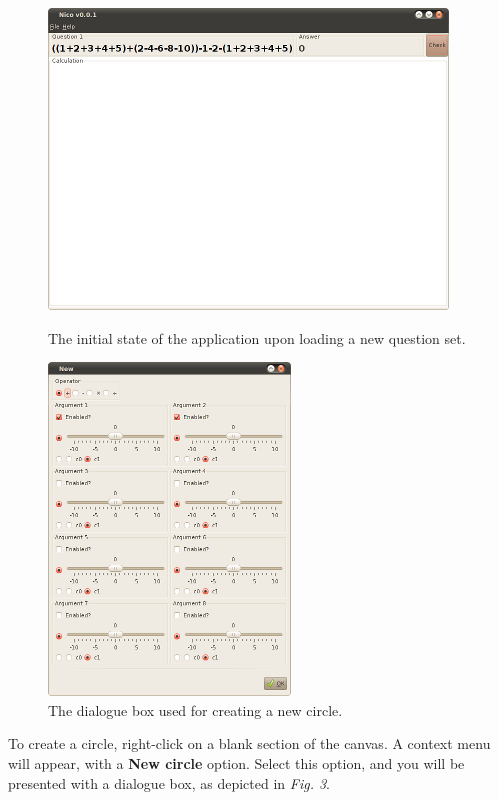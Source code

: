\documentclass[14pt]{article}
\begin{document}
\begin{figure}[!htb]
\begin{minipage}[b]{0.5\linewidth}
\centering
\includegraphics[scale=0.75]{fig2.png}
\caption{The initial state of the application upon loading a new question set.}
\end{minipage}
\hspace{0.5cm}
\begin{minipage}[b]{0.5\linewidth}
\centering
\includegraphics[scale=0.75]{fig3.png}
\caption{The dialogue box used for creating a new circle.}
\end{minipage}
\end{figure}

To create a circle, right-click on a blank section of the canvas.  A context menu
will appear, with a {\bf {\sffamily New circle}} option.  Select this option, and
you will be presented with a dialogue box, as depicted in \emph{Fig. 3}.
\end{document}

